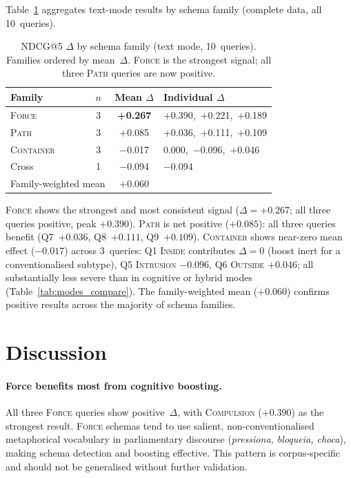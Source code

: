 \documentclass[11pt,a4paper]{article}
\begin{document}
Table~\ref{tab:schema} aggregates text-mode results by schema family
(complete data, all 10~queries).

\begin{table}[h]
\centering
\small
\setlength{\tabcolsep}{4pt}
\begin{tabular}{lccp{4.2cm}}
\toprule
\textbf{Family} & \textbf{$n$} & \textbf{Mean $\Delta$} & \textbf{Individual $\Delta$} \\
\midrule
\textsc{Force}     & 3 & \textbf{+0.267} & +0.390,\ +0.221,\ +0.189 \\
\textsc{Path}      & 3 & +0.085          & +0.036,\ +0.111,\ +0.109 \\
\textsc{Container} & 3 & $-$0.017        & 0.000,\ $-$0.096,\ +0.046 \\
Cross              & 1 & $-$0.094        & $-$0.094 \\
\midrule
\multicolumn{2}{l}{Family-weighted mean} & +0.060 & \\
\bottomrule
\end{tabular}
\caption{NDCG@5 $\Delta$ by schema family (text mode, 10~queries).
  Families ordered by mean~$\Delta$. \textsc{Force} is the strongest
  signal; all three \textsc{Path} queries are now positive.}
\label{tab:schema}
\end{table}

\textsc{Force} shows the strongest and most consistent signal
($\Delta = +0.267$; all three queries positive, peak $+0.390$).
\textsc{Path} is net positive ($+0.085$): all three queries benefit
(Q7~$+0.036$, Q8~$+0.111$, Q9~$+0.109$).
\textsc{Container} shows near-zero mean effect ($-0.017$) across
3~queries: Q1 \textsc{Inside} contributes $\Delta{=}0$
(boost inert for a conventionalised subtype), Q5 \textsc{Intrusion}
$-0.096$, Q6 \textsc{Outside} $+0.046$; all substantially less severe
than in cognitive or hybrid modes (Table~\ref{tab:modes_compare}).
The family-weighted mean ($+0.060$) confirms positive results across
the majority of schema families.

\section{Discussion}
\label{sec:discussion}

\paragraph{Force benefits most from cognitive boosting.}
All three \textsc{Force} queries show positive~$\Delta$, with
\textsc{Compulsion} ($+0.390$) as the strongest result.
\textsc{Force} schemas tend to use salient, non-conventionalised
metaphorical vocabulary in parliamentary discourse
(\emph{pressiona, bloqueia, choca}), making schema detection and
boosting effective.
This pattern is corpus-specific and should not be generalised without
further validation.
\end{document}
